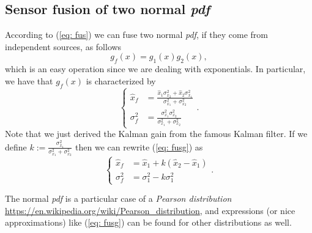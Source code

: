 \documentclass[11pt,a4paper]{article}
\begin{document}
\subsection{Sensor fusion of two normal \emph{pdf}}
According to (\ref{eq: fus}) we can fuse two normal \emph{pdf}, if they come from independent sources, as follows
\begin{equation}
g_f(x) = g_1(x)g_2(x),
\end{equation}
which is an easy operation since we are dealing with exponentials. In particular, we have that $g_f(x)$ is characterized by
\begin{equation}
	\begin{cases}
		\hat x_f &= \frac{\hat x_1\sigma_{x_2}^2 + \hat x_2\sigma_{x_1}^2 }{\sigma_{x_1}^2 + \sigma_{x_2}^2} \\
		\sigma_f^2 &= \frac{\sigma_{x_1}^2 \sigma_{x_2}^2}{\sigma_{x_1}^2 + \sigma_{x_2}^2}
	\end{cases}.
	\label{eq: fusg}
\end{equation}
Note that we just derived the Kalman gain from the famous Kalman filter. If we define $k := \frac{\sigma_{x_1}^2}{\sigma_{x_1}^2 + \sigma_{x_2}^2}$ then we can rewrite (\ref{eq: fusg}) as
\begin{equation}
	\begin{cases}
		\hat x_f &= \hat x_1 + k(\hat x_2 - \hat x_1) \\
		\sigma_f^2 &= \sigma_1^2 - k\sigma_1^2
	\end{cases}.
	\label{eq: fusg2}
\end{equation}

The normal \emph{pdf} is a particular case of a \emph{Pearson distribution} \url{https://en.wikipedia.org/wiki/Pearson_distribution}, and expressions (or nice approximations) like (\ref{eq: fusg}) can be found for other distributions as well.
\end{document}
